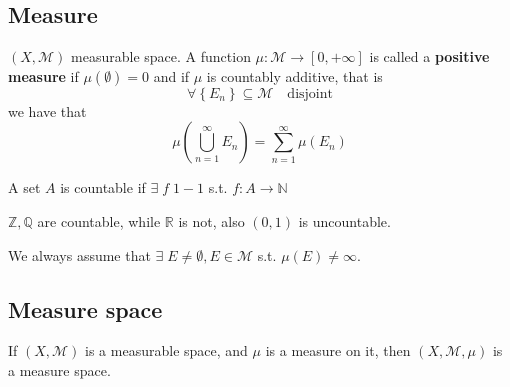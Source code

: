\subsection{Measure}
\begin{definition}
    \((X, \mathcal{M})\) measurable space. A function \(\mu :  \mathcal{M} \to [0, +\infty]\) is called a \textbf{positive measure} if \(\mu(\emptyset) = 0\) and if \(\mu\) is countably additive, that is 
    \[
        \forall \left\lbrace E_n \right\rbrace \subseteq \mathcal{M} \quad \mbox{disjoint}
    \]
    we have that \[
        \mu\left(\bigcup_{n=1}^{\infty} E_n\right) = \sum_{n = 1}^{\infty} \mu(E_n) \tag*{\(\sigma\)-additivity}
    \]
\end{definition}
\begin{remark}
    A set \(A\) is countable if \(\exists \; f \; 1-1\) s.t. \(f: A\to \mathbb{N}\)
\end{remark}
\begin{example}
    \(\mathbb{Z}, \mathbb{Q}\) are countable, while \(\mathbb{R}\) is not, also \((0,1)\) is uncountable.
\end{example}
We always assume that \(\exists \; E \not = \emptyset, E \in \mathcal{M}\) s.t. \(\mu(E) \not = \infty\). 
\subsection{Measure space}
If \((X,\mathcal{M})\) is a measurable space, and \(\mu\) is a measure on it, then \((X, \mathcal{M}, \mu)\) is a measure space.

